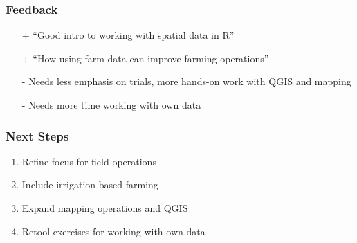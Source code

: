 \documentclass[11pt]{beamer}
\begin{document}
\begin{frame}[fragile]
\frametitle{Feedback}
  \begin{enumerate}[label=\arabic*]
    \item[+]  “Good intro to working with spatial data in R”
    \item[+]  “How using farm data can improve farming operations”
    \item[-]  Needs less emphasis on trials, more hands-on work with QGIS and mapping
    \item[-]  Needs more time working with own data
  \end{enumerate}
\end{frame}

\begin{frame}[fragile]
\frametitle{Next Steps}
  \begin{enumerate}[label=\arabic*]
    \item  Refine focus for field operations
    \item  Include irrigation-based farming
    \item  Expand mapping operations and QGIS
    \item  Retool exercises for working with own data
  \end{enumerate}
\end{frame}

\end{document}
